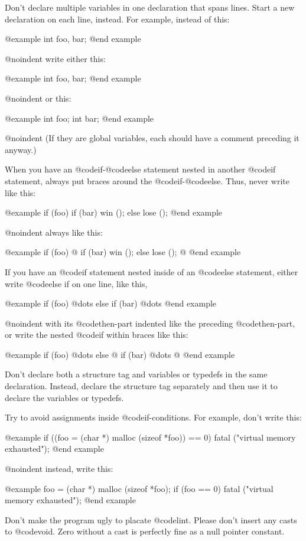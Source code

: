 Don't declare multiple variables in one declaration that spans lines.
Start a new declaration on each line, instead.  For example, instead
of this:

@example
int    foo,
       bar;
@end example

@noindent
write either this:

@example
int foo, bar;
@end example

@noindent
or this:

@example
int foo;
int bar;
@end example

@noindent
(If they are global variables, each should have a comment preceding it
anyway.)

When you have an @code{if}-@code{else} statement nested in another
@code{if} statement, always put braces around the @code{if}-@code{else}.
Thus, never write like this:

@example
if (foo)
  if (bar)
    win ();
  else
    lose ();
@end example

@noindent
always like this:

@example
if (foo)
  @{
    if (bar)
      win ();
    else
      lose ();
  @}
@end example

If you have an @code{if} statement nested inside of an @code{else}
statement, either write @code{else if} on one line, like this,

@example
if (foo)
  @dots{}
else if (bar)
  @dots{}
@end example

@noindent
with its @code{then}-part indented like the preceding @code{then}-part,
or write the nested @code{if} within braces like this:

@example
if (foo)
  @dots{}
else
  @{
    if (bar)
      @dots{}
  @}
@end example

Don't declare both a structure tag and variables or typedefs in the
same declaration.  Instead, declare the structure tag separately
and then use it to declare the variables or typedefs.

Try to avoid assignments inside @code{if}-conditions.  For example,
don't write this:

@example
if ((foo = (char *) malloc (sizeof *foo)) == 0)
  fatal ("virtual memory exhausted");
@end example

@noindent
instead, write this:

@example
foo = (char *) malloc (sizeof *foo);
if (foo == 0)
  fatal ("virtual memory exhausted");
@end example

Don't make the program ugly to placate @code{lint}.  Please don't insert any
casts to @code{void}.  Zero without a cast is perfectly fine as a null
pointer constant.

